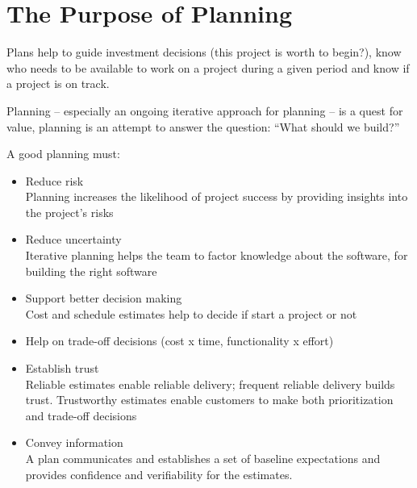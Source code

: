 \documentclass[a4paper,abntfigtabnum,noindentfirst]{abnt}
\begin{document}

\maketitle
\sumario
\listoftables
\listoffigures

\chapter{The Purpose of Planning}

Plans help to guide investment decisions (this project is worth to begin?), know who needs to be available to work on a project during a given period and know if a project is on track.

Planning – especially an ongoing iterative approach for planning – is a quest for value, planning is an attempt to answer the question: ``What should we build?''

A good planning must:
\begin{itemize}

\item Reduce risk\\
Planning increases the likelihood of project success by providing insights into the project's risks

\item Reduce uncertainty\\
Iterative planning helps the team to factor knowledge about the software, for building the right software

\item Support better decision making\\
Cost and schedule estimates help to decide if start a project or not

\item Help on trade-off decisions (cost x time, functionality x effort)

\item Establish trust\\
Reliable estimates enable reliable delivery; frequent reliable delivery builds trust. Trustworthy estimates enable customers to make both prioritization and trade-off decisions

\item Convey information\\
A plan communicates and establishes a set of baseline expectations and provides confidence and verifiability for the estimates.

\end{itemize}
\end{document}
